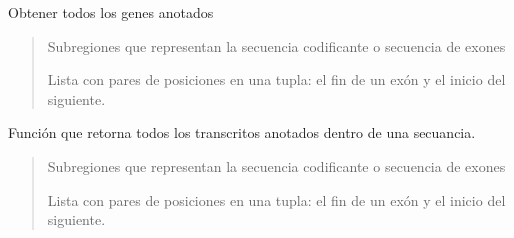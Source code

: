 \documentclass[letterpaper,10pt,spanish]{sphinxmanual}
\begin{document}
\begin{fulllineitems}
\label{\detokenize{diseno:diseno.get_all_genes}}
\pysigstartsignatures
{}
\pysigstopsignatures
\sphinxAtStartPar
Obtener todos los genes anotados
\begin{quote}\begin{description}
\sphinxAtStartPar
{} \textendash{} Subregiones que representan la secuencia codificante o secuencia de exones

\sphinxAtStartPar
Lista con pares de posiciones en una tupla: el fin de un exón y el inicio del siguiente.

\end{description}\end{quote}

\end{fulllineitems}


\begin{fulllineitems}
\label{\detokenize{diseno:diseno.get_all_transcripts}}
\pysigstartsignatures
{}
\pysigstopsignatures
\sphinxAtStartPar
Función que retorna todos los transcritos anotados dentro de una secuancia.
\begin{quote}\begin{description}
\sphinxAtStartPar
{} \textendash{} Subregiones que representan la secuencia codificante o secuencia de exones

\sphinxAtStartPar
Lista con pares de posiciones en una tupla: el fin de un exón y el inicio del siguiente.

\end{description}\end{quote}

\end{fulllineitems}

\end{document}

